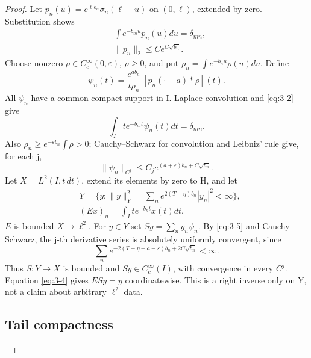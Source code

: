 \begin{proof}
Let \(p_n(u)=e^{\ell b_n}\sigma_n(\ell-u)\) on \((0,\ell)\), extended by zero. Substitution shows
\begin{equation}\label{eq:3-2}
\begin{aligned}
&\int e^{-b_m u}p_n(u)du=\delta_{mn},\\
& \|p_n\|_2\le C e^{C\sqrt{b_n}}.
\end{aligned}
\end{equation}
Choose nonzero \(\rho\in C_c^\infty(0,\varepsilon)\), \(\rho\ge0\), and put \(\rho_n=\int e^{-b_nu}\rho(u)du\). Define
\begin{equation}\label{eq:3-3}
\psi_n(t)=\frac{e^{ab_n}}{t\rho_n}\,[p_n(\cdot-a)*\rho](t).
\end{equation}
All \(\psi_n\) have a common compact support in I. Laplace convolution and \eqref{eq:3-2} give
\begin{equation}\label{eq:3-4}
\int_I t e^{-b_mt}\psi_n(t)dt=\delta_{mn}.
\end{equation}
Also \(\rho_n\ge e^{-\varepsilon b_n}\int\rho>0\); Cauchy--Schwarz for convolution and Leibniz' rule give, for each j,
\begin{equation}\label{eq:3-5}
\|\psi_n\|_{C^j}\le C_j e^{(a+\varepsilon)b_n+C\sqrt{b_n}}.
\end{equation}
Let \(X=L^2(I,t\,dt)\), extend its elements by zero to H, and let
\begin{equation}\label{eq:3-6}
\begin{aligned}
&Y=\{y:\|y\|_Y^2=\sum_n e^{2(T-\eta)b_n}|y_n|^2<\infty\},\\
&
(Ex)_n=\int_I t e^{-b_nt}x(t)dt.
\end{aligned}
\end{equation}
\(E\) is bounded \(X\to\ell^2\). For \(y\in Y\) set \(Sy=\sum_n y_n\psi_n\). By \eqref{eq:3-5} and Cauchy--Schwarz, the j-th derivative series is absolutely uniformly convergent, since
\begin{equation}\label{eq:3-7}
\sum_ne^{-2(T-\eta-a-\varepsilon)b_n+2C\sqrt{b_n}}<\infty.
\end{equation}
Thus \(S:Y\to X\) is bounded and \(Sy\in C_c^\infty(I)\), with convergence in every \(C^j\). Equation \eqref{eq:3-4} gives \(ESy=y\) coordinatewise. This is a right inverse only on Y, not a claim about arbitrary \(\ell^2\) data.

\subsection{Tail compactness}


\end{proof}
